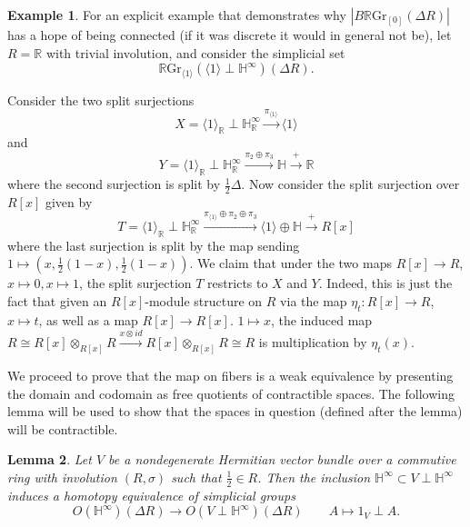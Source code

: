 \documentclass[edeposit,fullpage]{uiucthesis2009}
\newcommand{\mbb}{\mathbb}
\newcommand{\RGr}{\mathbb R\mathrm{Gr}}
\theoremstyle{plain}
\newtheorem{lemma}{Lemma}
\numberwithin{lemma}{section}
\theoremstyle{definition}
\newtheorem{example}[lemma]{Example}
\begin{document}
\begin{example}
For an
explicit example that demonstrates why $|B\RGr_{[0]}(\Delta
R)|$ has a hope of being connected (if it was discrete it would in
general not be), let $R = \mbb R$ with trivial involution, and
consider the simplicial set
\[
\RGr_{\langle 1 \rangle}(\langle 1 \rangle \perp \mbb H^\infty)(\Delta R).
\]

Consider the two split surjections
\[
X = \langle 1 \rangle_{\mbb R} \perp \mbb H_{\mbb R}^\infty
\xrightarrow{\pi_{\langle 1 \rangle}} \langle 1 \rangle
\]
and
\[
Y = \langle 1 \rangle_{\mbb R} \perp \mbb H_{\mbb R}^\infty
\xrightarrow{\pi_2 \oplus \pi_3} \mbb H \xrightarrow{+} \mbb R
\]
where the second surjection is split by $\frac{1}{2}\Delta$. 
Now consider the split surjection over $R[x]$ given by
\[
T = \langle 1 \rangle_{\mbb R} \perp \mbb H_{\mbb R}^\infty
\xrightarrow{\pi_{\langle 1 \rangle} \oplus \pi_2 \oplus \pi_3}
\langle 1 \rangle \oplus \mbb H \xrightarrow{+} R[x]
\]
where the last surjection is split by the map sending $1 \mapsto
(x,\frac{1}{2}(1-x),\frac{1}{2}(1-x))$. We claim
that under the two maps $R[x] \rightarrow R$, $x \mapsto 0, x \mapsto
1$, the split surjection $T$ restricts to $X$ and $Y$. Indeed, this is
just the fact that given an $R[x]$-module structure on $R$ via the map
$\eta_t: R[x] \rightarrow R$, $x \mapsto t$, as well as a map $R[x]
\rightarrow R[x]$. $1 \mapsto x$, 
the induced map $R \cong R[x]\otimes_{R[x]} R \xrightarrow{x \otimes id} R[x] \otimes_{R[x]}
R \cong R$ is multiplication by $\eta_t(x)$.
\end{example}

We proceed to prove that the map on fibers is a weak equivalence by
presenting the domain and codomain as free quotients of contractible
spaces. The following lemma will be used to show that the spaces in
question (defined after the lemma) will be contractible. 


\begin{lemma}\label{lem:incHE}
Let $V$ be a nondegenerate Hermitian vector bundle over a commutive
ring with involution $(R,\sigma)$ such that $\frac{1}{2} \in R$. Then
the inclusion $\mbb H^\infty \subset V \perp \mbb H^\infty$ induces a
homotopy equivalence of simplicial groups
\[
O(\mbb H^\infty)(\Delta R) \rightarrow O(V \perp \mbb
H^\infty)(\Delta R) \qquad A \mapsto 1_V \perp A.
\]
\end{lemma}
\end{document}
